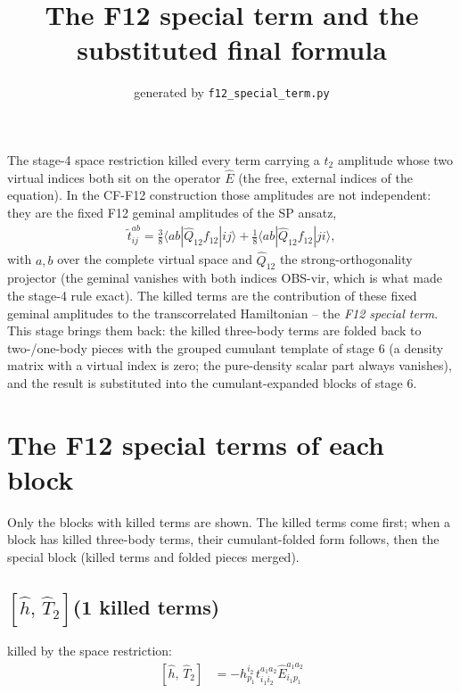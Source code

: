 \documentclass[11pt]{article}
\title{The F12 special term and the substituted final formula}
\date{generated by \texttt{f12\_special\_term.py}}
\begin{document}
\maketitle

The stage-4 space restriction killed every term carrying a $t_2$ amplitude whose two virtual indices both sit on the operator $\hat E$ (the free, external indices of the equation).  In the CF-F12 construction those amplitudes are not independent: they are the fixed F12 geminal amplitudes of the SP ansatz,
\begin{align}
\tilde t^{ab}_{ij} = \tfrac{3}{8}\langle ab|\hat Q_{12} f_{12}|ij\rangle + \tfrac{1}{8}\langle ab|\hat Q_{12} f_{12}|ji\rangle,
\end{align}
with $a,b$ over the complete virtual space and $\hat Q_{12}$ the strong-orthogonality projector (the geminal vanishes with both indices OBS-vir, which is what made the stage-4 rule exact).  The killed terms are the contribution of these fixed geminal amplitudes to the transcorrelated Hamiltonian -- the \emph{F12 special term}.  This stage brings them back: the killed three-body terms are folded back to two-/one-body pieces with the grouped cumulant template of stage 6 (a density matrix with a virtual index is zero; the pure-density scalar part always vanishes), and the result is substituted into the cumulant-expanded blocks of stage 6.

\section{The F12 special terms of each block}
Only the blocks with killed terms are shown.  The killed terms come first; when a block has killed three-body terms, their cumulant-folded form follows, then the special block (killed terms and folded pieces merged).
\subsection*{$\left[\hat{h},\, \hat{T}_{2}\right]$\quad(1 killed terms)}
killed by the space restriction:
\begin{align}
\left[\hat{h},\, \hat{T}_{2}\right] &= - h^{i_{2}}_{p_{1}} t^{a_{1}a_{2}}_{i_{1}i_{2}} \hat{E}^{a_{1}a_{2}}_{i_{1}p_{1}}
\end{align}
\end{document}
